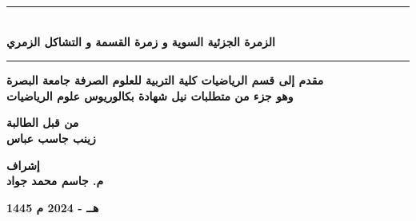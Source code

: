 \begin{titlepage}
	\vspace{1cm}
	
	\begin{center}
		\rule{100mm}{0.5mm}\\
		\vspace{1cm}
		\large \textbf{الزمرة الجزئية السوية و زمرة القسمة و التشاكل الزمري}\\
		\vspace{12pt}
		\rule{100mm}{0.5mm}
	\end{center}
	\vfill
	\begin{center}
		\textbf{مقدم إلى قسم الرياضيات كلية التربية للعلوم الصرفة جامعة البصرة\\
			\vspace{6pt}
			وهو جزء من متطلبات نيل شهادة بكالوريوس علوم الرياضيات}
	\end{center}
	\vfill
	\begin{center}
		\textbf{من قبل الطالبة}\\
		\vspace{8pt}
		\textbf{زينب جاسب عباس}
	\end{center}
	\vspace{10pt}
	\begin{center}
		\textbf{إشراف}\\
		\vspace{8pt}
		\textbf{م. جاسم محمد جواد}
	\end{center}
	\vspace{10pt}
	\begin{center}
		\textbf{1445 ه‍ــ - 2024 م}
	\end{center}
\end{titlepage}
\restoregeometry